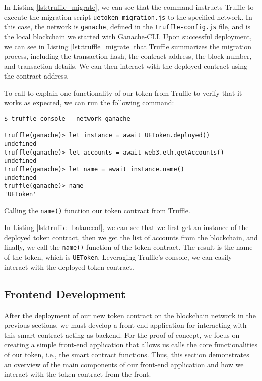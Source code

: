 In Listing \ref{lst:truffle_migrate}, we can see that the command instructs Truffle to execute the migration script \texttt{uetoken\_migration.js}
to the specified network. In this case, the network is \texttt{ganache}, defined in the \texttt{truffle-config.js} file, and is the local
blockchain we started with Ganache-CLI. Upon successful deployment, we can see in Listing \ref{lst:truffle_migrate} that Truffle summarizes the migration
process, including the transaction hash, the contract address, the block number, and transaction details. We can then interact with the deployed contract
using the contract address.

To call to explain one functionality of our token from Truffle to verify that it works as expected, we can run the following command:

\begin{listing}[H]
    \begin{verbatim}
$ truffle console --network ganache

truffle(ganache)> let instance = await UEToken.deployed()
undefined
truffle(ganache)> let accounts = await web3.eth.getAccounts()
undefined
truffle(ganache)> let name = await instance.name()
undefined
truffle(ganache)> name
'UEToken'
    \end{verbatim}
    \caption{Calling the \texttt{name()} function our token contract from Truffle.}
    \label{lst:truffle_balanceof}
\end{listing}

In Listing \ref{lst:truffle_balanceof}, we can see that we first get an instance of the deployed token contract, then we get the list of accounts
from the blockchain, and finally, we call the \texttt{name()} function of the token contract. The result is the name of the token, which is \texttt{UEToken}. Leveraging Truffle's console, we can easily interact with the deployed token contract.


\subsection{Frontend Development}
\label{subsec:wallet_frontend}

After the deployment of our new token contract on the blockchain network in the previous sections, we must develop a front-end application for interacting with this smart contract
acting as backend.
For the proof-of-concept, we focus on creating a simple front-end application that allows us calls the core functionalities of our token, i.e., the smart contract functions.
Thus, this section demonstrates an overview of the main components of our front-end application and how we interact with the token contract from the front.

